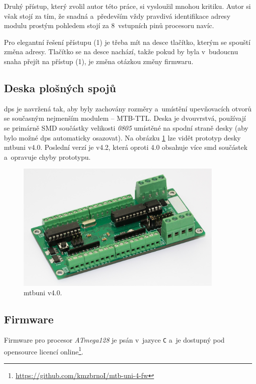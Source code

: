 Druhý přístup, který zvolil autor této práce, si vysloužil mnohou kritiku.
Autor si však stojí za tím, že snadná a~především vždy pravdivá identifikace
adresy modulu prostým pohledem stojí za 8~vstupních pinů procesoru navíc.

Pro elegantní řešení přístupu (1) je třeba mít na desce tlačítko, kterým se
spouští změna adresy. Tlačítko se na desce nachází, takže pokud by byla
v~budoucnu snaha přejít na přístup (1), je změna otázkou změny firmwaru.

\subsection{Deska plošných spojů}

\gls{dps} je navržená tak, aby byly zachovány rozměry a~umístění
upevňovacích otvorů se současným nejmenším modulem – MTB-TTL. Deska je
dvouvrstvá, používají se primárně SMD součástky velikosti \textit{0805} umístěné
na spodní straně desky (aby bylo možné \gls{dps} automaticky osazovat). Na
obrázku \ref{fig:mtb-uni-v4} lze vidět prototyp desky \gls{mtbuni} v4.0.
Poslední verzí je v4.2, která oproti 4.0 obsahuje více \gls{smd}
součástek a~opravuje chyby prototypu.

\begin{figure}[ht]
\includegraphics[width=0.9\textwidth]{data/uni-v40-screw-all.jpg}
\caption{\gls{mtbuni} v4.0.}
\label{fig:mtb-uni-v4}
\end{figure}

\subsection{Firmware}

Firmware pro procesor \textit{ATmega128} je psán v~jazyce \texttt{C} a~je
dostupný pod opensource licencí
online\footnote{\url{https://github.com/kmzbrnoI/mtb-uni-4-fw}}.

